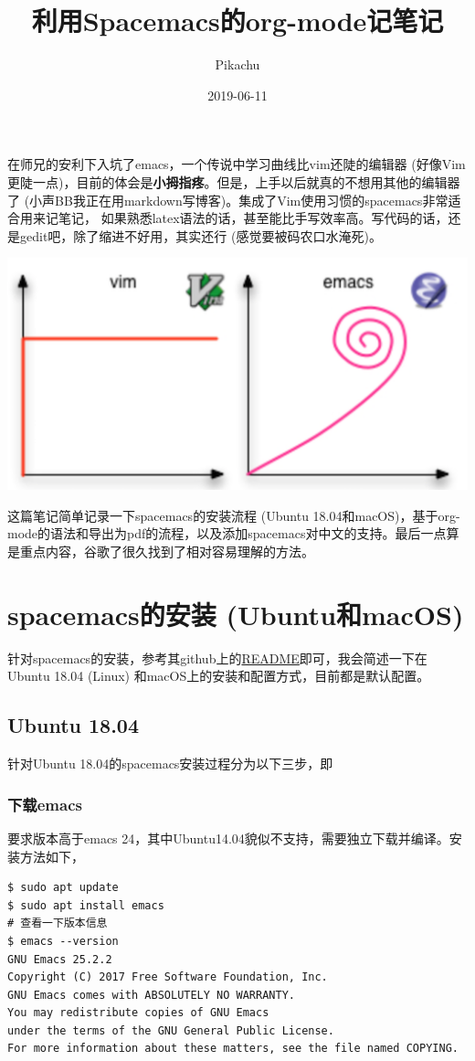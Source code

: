 \documentclass[11pt]{article}
\author{Pikachu}
\date{2019-06-11}
\title{利用Spacemacs的org-mode记笔记}
\begin{document}
\maketitle
\tableofcontents

\newpage
在师兄的安利下入坑了emacs，一个传说中学习曲线比vim还陡的编辑器 (好像Vim更陡一点)，目前的体会是\textbf{小拇指疼}。但是，上手以后就真的不想用其他的编辑器了 (小声BB我正在用markdown写博客)。集成了Vim使用习惯的spacemacs非常适合用来记笔记，
如果熟悉latex语法的话，甚至能比手写效率高。写代码的话，还是gedit吧，除了缩进不好用，其实还行 (感觉要被码农口水淹死)。

\begin{center}
\includegraphics[width=.9\linewidth]{./fig1.png}
\end{center}

这篇笔记简单记录一下spacemacs的安装流程 (Ubuntu 18.04和macOS)，基于org-mode的语法和导出为pdf的流程，以及添加spacemacs对中文的支持。最后一点算是重点内容，谷歌了很久找到了相对容易理解的方法。

\section{spacemacs的安装 (Ubuntu和macOS)}
\label{sec:orge68f359}
针对spacemacs的安装，参考其github上的\href{https://github.com/syl20bnr/spacemacs\#default-installation}{README}即可，我会简述一下在Ubuntu 18.04 (Linux) 和macOS上的安装和配置方式，目前都是默认配置。

\subsection{Ubuntu 18.04}
\label{sec:org41ddc55}
针对Ubuntu 18.04的spacemacs安装过程分为以下三步，即

\subsubsection{下载emacs}
\label{sec:org1611c6a}
要求版本高于emacs 24，其中Ubuntu14.04貌似不支持，需要独立下载并编译。安装方法如下，
\begin{center}
\begin{verbatim}
$ sudo apt update
$ sudo apt install emacs
# 查看一下版本信息
$ emacs --version
GNU Emacs 25.2.2
Copyright (C) 2017 Free Software Foundation, Inc.
GNU Emacs comes with ABSOLUTELY NO WARRANTY.
You may redistribute copies of GNU Emacs
under the terms of the GNU General Public License.
For more information about these matters, see the file named COPYING.
\end{verbatim}
\end{center}
\end{document}
